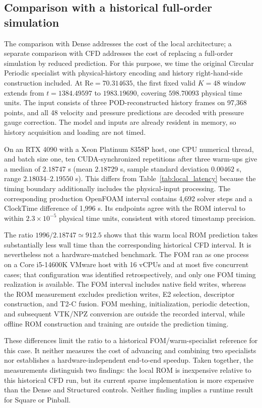 \subsection{Comparison with a historical full-order simulation}
\label{app:cost_fom_reference}

The comparison with Dense addresses the cost of the local architecture;
a separate comparison with CFD addresses the cost of replacing a
full-order simulation by reduced prediction. For this purpose, we time
the original Circular Periodic specialist with physical-history encoding
and history right-hand-side construction included. At
$\mathrm{Re}=70.314635$, the first fixed valid $K=48$ window extends
from $t=1384.49597$ to $1983.19690$, covering $598.70093$ physical time
units. The input consists of three POD-reconstructed history frames on
97,368 points, and all 48 velocity and pressure predictions are decoded
with pressure gauge correction. The model and inputs are already
resident in memory, so history acquisition and loading are not timed.

On an RTX 4090 with a Xeon Platinum 8358P host, one CPU numerical
thread, and batch size one, ten CUDA-synchronized repetitions after
three warm-ups give a median of $2.18747$ s (mean $2.18729$ s, sample
standard deviation $0.00462$ s, range $2.18034$--$2.19550$ s).
This differs from Table~\ref{tab:local_latency} because the timing
boundary additionally includes the physical-input processing.
The corresponding production OpenFOAM interval contains 4,692 solver
steps and a ClockTime difference of 1,996 s. Its endpoints agree with
the ROM interval to within $2.3\times10^{-5}$ physical time units,
consistent with stored timestamp precision.

The ratio $1996/2.18747\simeq912.5$ shows that this warm local ROM
prediction takes substantially less wall time than the corresponding
historical CFD interval. It is nevertheless not a hardware-matched
benchmark. The FOM ran as one process on a Core i5-14600K VMware host
with 16 vCPUs and at most five concurrent cases; that configuration
was identified retrospectively, and only one FOM timing realization
is available. The FOM interval includes native field writes, whereas
the ROM measurement excludes prediction writes, E2 selection,
descriptor construction, and T2-C fusion. FOM meshing, initialization,
periodic detection, and subsequent VTK/NPZ conversion are outside the
recorded interval, while offline ROM construction and training are
outside the prediction timing.

These differences limit the ratio to a historical FOM/warm-specialist
reference for this case. It neither measures the cost of advancing and
combining two specialists nor establishes a hardware-independent
end-to-end speedup. Taken together, the measurements distinguish two
findings: the local ROM is inexpensive relative to this historical CFD
run, but its current sparse implementation is more expensive than the
Dense and Structured controls. Neither finding implies a runtime result
for Square or Pinball.
